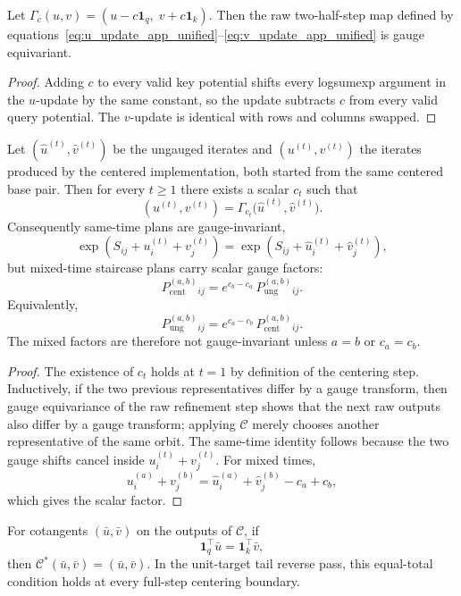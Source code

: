 \begin{lemma}
Let $\Gamma_c(u,v)=(u-c\mathbf{1}_q,\; v+c\mathbf{1}_k)$. Then the raw two-half-step map defined by equations~\eqref{eq:u_update_app_unified}--\eqref{eq:v_update_app_unified} is gauge equivariant.
\end{lemma}

\begin{proof}
Adding $c$ to every valid key potential shifts every logsumexp argument in the $u$-update by the same constant, so the update subtracts $c$ from every valid query potential. The $v$-update is identical with rows and columns swapped.
\end{proof}

\begin{proposition}
Let $(\widehat u^{(t)},\widehat v^{(t)})$ be the ungauged iterates and $(u^{(t)},v^{(t)})$ the iterates produced by the centered implementation, both started from the same centered base pair. Then for every $t\ge 1$ there exists a scalar $c_t$ such that
\[
(u^{(t)},v^{(t)})=\Gamma_{c_t}\bigl(\widehat u^{(t)},\widehat v^{(t)}\bigr).
\]
Consequently same-time plans are gauge-invariant,
\[
\exp(S_{ij}+u_i^{(t)}+v_j^{(t)})
=
\exp(S_{ij}+\widehat u_i^{(t)}+\widehat v_j^{(t)}),
\]
but mixed-time staircase plans carry scalar gauge factors:
\[
P_{\mathrm{cent}}^{(a,b)}{}_{ij}
=
e^{c_b-c_a}\,
P_{\mathrm{ung}}^{(a,b)}{}_{ij}.
\]
Equivalently,
\[
P_{\mathrm{ung}}^{(a,b)}{}_{ij}
=
e^{c_a-c_b}\,
P_{\mathrm{cent}}^{(a,b)}{}_{ij}.
\]
The mixed factors are therefore not gauge-invariant unless $a=b$ or $c_a=c_b$.
\end{proposition}

\begin{proof}
The existence of $c_t$ holds at $t=1$ by definition of the centering step. Inductively, if the two previous representatives differ by a gauge transform, then gauge equivariance of the raw refinement step shows that the next raw outputs also differ by a gauge transform; applying $\mathcal{C}$ merely chooses another representative of the same orbit. The same-time identity follows because the two gauge shifts cancel inside $u_i^{(t)}+v_j^{(t)}$. For mixed times,
\[
u_i^{(a)}+v_j^{(b)}
=
\widehat u_i^{(a)}+\widehat v_j^{(b)}-c_a+c_b,
\]
which gives the scalar factor.
\end{proof}

\begin{lemma}
For cotangents $(\bar u,\bar v)$ on the outputs of $\mathcal C$, if
\[
\mathbf{1}_q^\top \bar u=\mathbf{1}_k^\top \bar v,
\]
then $\mathcal C^*(\bar u,\bar v)=(\bar u,\bar v)$. In the unit-target tail reverse pass, this equal-total condition holds at every full-step centering boundary.
\end{lemma}

